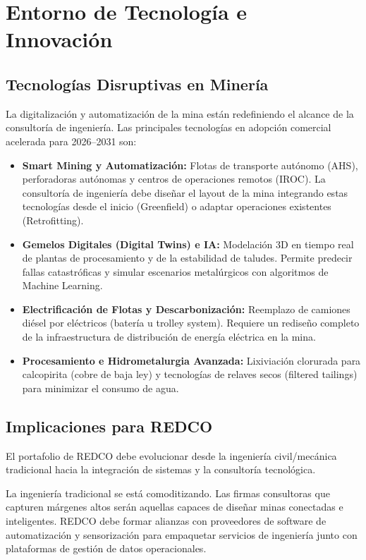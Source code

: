 \chapter{Entorno de Tecnología e Innovación}

\section{Tecnologías Disruptivas en Minería}
La digitalización y automatización de la mina están redefiniendo el alcance de la consultoría de ingeniería. Las principales tecnologías en adopción comercial acelerada para 2026--2031 son:

\begin{itemize}
    \item \textbf{Smart Mining y Automatización:} Flotas de transporte autónomo (AHS), perforadoras autónomas y centros de operaciones remotos (IROC). La consultoría de ingeniería debe diseñar el layout de la mina integrando estas tecnologías desde el inicio (Greenfield) o adaptar operaciones existentes (Retrofitting).
    \item \textbf{Gemelos Digitales (Digital Twins) e IA:} Modelación 3D en tiempo real de plantas de procesamiento y de la estabilidad de taludes. Permite predecir fallas catastróficas y simular escenarios metalúrgicos con algoritmos de Machine Learning.
    \item \textbf{Electrificación de Flotas y Descarbonización:} Reemplazo de camiones diésel por eléctricos (batería u trolley system). Requiere un rediseño completo de la infraestructura de distribución de energía eléctrica en la mina.
    \item \textbf{Procesamiento e Hidrometalurgia Avanzada:} Lixiviación clorurada para calcopirita (cobre de baja ley) y tecnologías de relaves secos (filtered tailings) para minimizar el consumo de agua.
\end{itemize}

\section{Implicaciones para REDCO}
El portafolio de REDCO debe evolucionar desde la ingeniería civil/mecánica tradicional hacia la integración de sistemas y la consultoría tecnológica.

\begin{keyinsightbox}
La ingeniería tradicional se está comoditizando. Las firmas consultoras que capturen márgenes altos serán aquellas capaces de diseñar minas conectadas e inteligentes. REDCO debe formar alianzas con proveedores de software de automatización y sensorización para empaquetar servicios de ingeniería junto con plataformas de gestión de datos operacionales.
\end{keyinsightbox}
